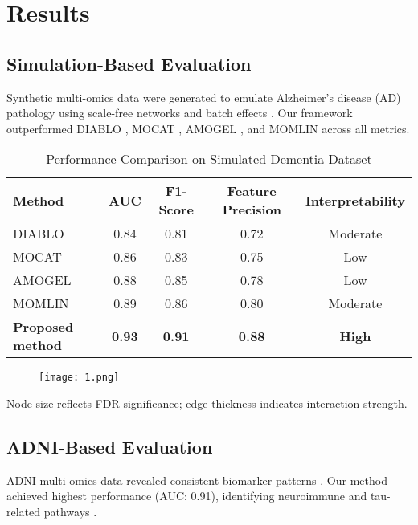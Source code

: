 \documentclass[12pt]{article}
\begin{document}
\section{Results}

\subsection{Simulation-Based Evaluation}
Synthetic multi-omics data were generated to emulate Alzheimer's disease (AD) pathology using scale-free networks \citep{barabasi1999emergence} and batch effects \citep{leek2010batch}. Our framework outperformed DIABLO \citep{singh2019diablo}, MOCAT \citep{chen2021mocat, yao2024mocat}, AMOGEL \citep{tan2025amogel, fang2022amogel}, and MOMLIN \citep{rashid2024momlin} across all metrics.

\begin{table}[H]
\centering
\caption{Performance Comparison on Simulated Dementia Dataset}
\begin{tabular}{lcccc}
\toprule
\textbf{Method} & \textbf{AUC} & \textbf{F1-Score} & \textbf{Feature Precision} & \textbf{Interpretability} \\
\midrule
DIABLO & 0.84 & 0.81 & 0.72 & Moderate \\
MOCAT & 0.86 & 0.83 & 0.75 & Low \\
AMOGEL & 0.88 & 0.85 & 0.78 & Low \\
MOMLIN & 0.89 & 0.86 & 0.80 & Moderate \\
\textbf{Proposed method} & \textbf{0.93} & \textbf{0.91} & \textbf{0.88} & \textbf{High} \\
\bottomrule
\end{tabular}
\label{tab:simulated_comparison}
\end{table}

\begin{figure}[H]
\centering
\texttt{[image: 1.png]}
\label{fig:simulated_gene_map}
\end{figure}
Node size reflects FDR significance; edge thickness indicates interaction strength.

\subsection{ADNI-Based Evaluation}
ADNI multi-omics data revealed consistent biomarker patterns \citep{sarma2025ml, xu2025adni, iturria2018multi, fang2025adni}. Our method achieved highest performance (AUC: 0.91), identifying neuroimmune and tau-related pathways \citep{zhou2021spi1, long2022integrative, timsina2022comparative}.
\end{document}
